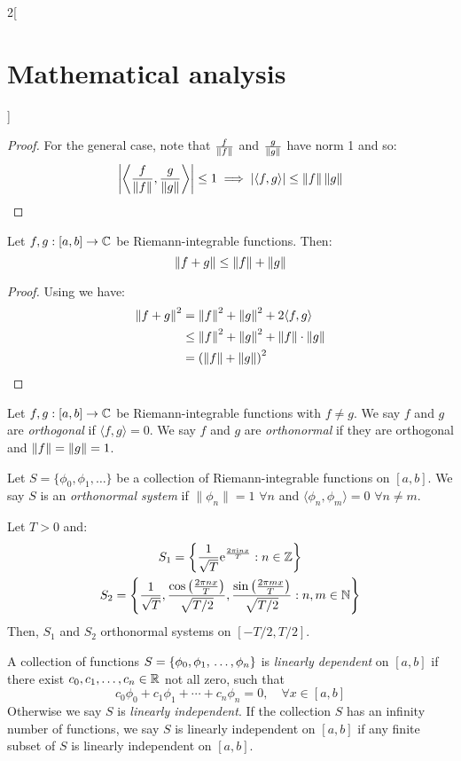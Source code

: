 \documentclass[../../../main_math.tex]{subfiles}
\begin{document}
\begin{multicols}{2}[\section{Mathematical analysis}]
\begin{proof}
    For the general case, note that $\frac{f}{\left\|f\right\|}$ and $\frac{g}{\left\|g\right\|}$ have norm 1 and so: $$\abs{\left\langle \frac{f}{\left\|f\right\|},\frac{g}{\left\|g\right\|}\right\rangle}\leq 1\implies\abs{\langle f,g\rangle}\leq\left\|f\right\|\left\|g\right\|$$
  \end{proof}
  \begin{theorem}
    Let $f,g:[a,b]\rightarrow\mathbb{C} $ be Riemann-integrable functions. Then: $$\| f+g\|\leq\left\|f\right\|+\|g\|$$
  \end{theorem}
  \begin{proof}
    Using  we have:
    \begin{align*}
      \left\|f+g\right\|^2 & =\left\|f\right\|^2+\left\|g\right\|^2+2\langle f,g\rangle   \\
                   & \leq\left\|f\right\|^2+\left\|g\right\|^2+\left\|f\right\|\cdot\|g\| \\
                   & ={\left(\left\|f\right\|+\left\|g\right\|\right)}^2
    \end{align*}
  \end{proof}
  \begin{definition}
    Let $f,g:[a,b]\rightarrow\mathbb{C} $ be Riemann-integrable functions with $f\ne g$. We say $f$ and $g$ are \emph{orthogonal} if $\langle f,g\rangle=0$. We say $f$ and $g$ are \emph{orthonormal} if they are orthogonal and $\left\|f\right\|=\|g\|=1$.
  \end{definition}
  \begin{definition}
    Let $S=\{\phi_0,\phi_1,\ldots\}$ be a collection of Riemann-integrable functions on $[a,b]$. We say $S$ is an \emph{orthonormal system} if $\|\phi_n\|=1$ $\forall n$ and $\langle\phi_n,\phi_m\rangle=0$ $\forall n\ne m$.
  \end{definition}
  \begin{proposition}
    Let $T>0$ and:
    \begin{gather*}
      S_1=\left\{\frac{1}{\sqrt{T}}\mathrm{e}^{\frac{2\pi\mathrm{i} nx}{T}}:n\in\mathbb{Z} \right\}\\ S_2=\left\{\frac{1}{\sqrt{T}},\frac{\cos\left(\frac{2\pi nx}{T}\right)}{\sqrt{T/2}},\frac{\sin\left(\frac{2\pi mx}{T}\right)}{\sqrt{T/2}}:n,m\in\mathbb{N} \right\}
    \end{gather*} Then, $S_1$ and $S_2$ orthonormal systems on $[-T/2,T/2]$.
  \end{proposition}
  \begin{definition}
    A collection of functions $S=\{\phi_0,\phi_1,\\\ldots,\phi_n\}$ is \emph{linearly dependent} on $[a,b]$ if there exist $c_0,c_1,\ldots,c_n\in\mathbb{R} $ not all zero, such that $$c_0\phi_0+c_1\phi_1+\cdots+c_n\phi_n=0,\quad\forall x\in[a,b]$$ Otherwise we say $S$ is \emph{linearly independent}. If the collection $S$ has an infinity number of functions, we say $S$ is linearly independent on $[a,b]$ if any finite subset of $S$ is linearly independent on $[a,b]$.

\end{definition}
\end{multicols}
\end{document}
